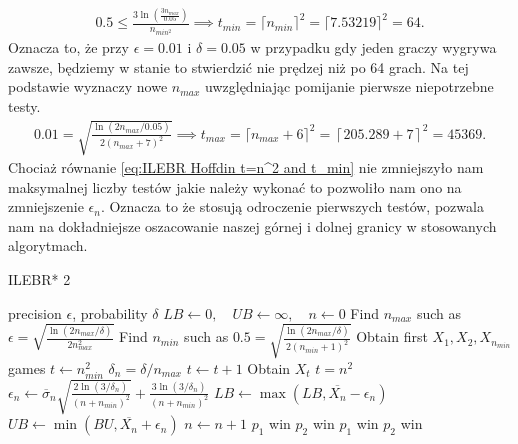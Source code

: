 \documentclass[inzynierska]{pwr_wmat_praca_dyplomowa}
\theoremstyle{plain}
\numberwithin{theorem}{chapter}
\theoremstyle{definition}
\numberwithin{theorem}{chapter}
\begin{document}
	\begin{gather*}
		\label{eq:ILEBR Bernstein t=n^2}
		0.5 \le \frac{3  \ln(\frac{3n_{max}}{0.05})}{n_{min^2}}\implies t_{min} = \lceil n_{min} \rceil^2 = \lceil7.53219\rceil^2= 64. 
	\end{gather*}
	Oznacza to, że przy $\epsilon=0.01$ i $\delta= 0.05$ w przypadku gdy jeden graczy wygrywa zawsze, będziemy w stanie to stwierdzić nie prędzej niż po 64 grach.
	Na tej podstawie wyznaczy nowe $n_{max}$ uwzględniając pomijanie pierwsze niepotrzebne testy.
	\begin{gather}
		\label{eq:ILEBR Hoffdin t=n^2 and t_min}
		0.01 =  \sqrt{\frac{\ln(2n_{max}/0.05)}{2(n_{max}+7)^2}} \implies t_{max} = \lceil n_{max}+6\rceil^2 = \left\lceil 205.289+7\right\rceil^2= 45369.
	\end{gather}
	Chociaż równanie \ref{eq:ILEBR Hoffdin t=n^2 and t_min} nie zmniejszyło nam maksymalnej liczby testów jakie należy wykonać to pozwoliło nam ono na zmniejszenie $\epsilon_n$. Oznacza to że stosują odroczenie pierwszych testów, pozwala nam na dokładniejsze oszacowanie naszej górnej i dolnej granicy w stosowanych algorytmach.
	\begin{algorithm}[H]\captionsetup{labelformat=custom2}
		\caption{ILEBR* 2}\label{alg:IEBLR* 2}
		\begin{algorithmic}
			\Ensure precision $\epsilon$, probability $\delta$ 
			\State  $ LB \gets 0,\quad UB \gets \infty, \quad n \gets 0 $
			\State Find $n_{max}$ such as $		\epsilon =  \sqrt{\frac{\ln(2n_{max}/\delta)}{2n_{max}^2}} $
			\State Find $n_{min}$ such as $		0.5 =  \sqrt{\frac{\ln(2n_{max}/\delta)}{2(n_{min}+1)^2}} $
			\State Obtain first $X_1,X_2,X_{n_{min}}$ games 
			\State $t \gets n_{min}^2$
			\Statex $\delta_n = \delta/n_{max}$
			\Repeat 
			\State $t \gets t + 1$
			\State Obtain $X_t$
			\Until $t=n^2$
			\State $\epsilon_n \gets \overline{\sigma}_n \sqrt{\frac{2\ln(3/\delta_n)}{(n+n_{min})^2}} + \frac{3  \ln{(3 / \delta_n)}}{(n+n_{min})^2}$ 
			\State $LB \gets \max(LB,  \overline{X_n} - \epsilon_n)$
			\State $UB \gets \min(BU,  \overline{X_n} + \epsilon_n)$
			\State $n \gets n + 1$
			\EndWhile
			\State \Return $p_1$ win
			\State \Return $p_2$ win
			\State \Return $p_1$ win
			\Else
			\State \Return $p_2$ win
			\EndIf
		\end{algorithmic}
	\end{algorithm}
	\newpage
\end{document}
